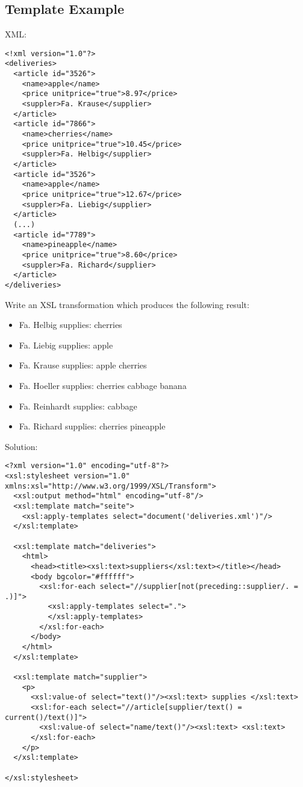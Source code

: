 \documentclass[11pt]{article}
\begin{document}
\subsection{Template Example}
\label{sec:orge6c1ba5}
XML:
\lstset{breaklines=true,language=XML,label= ,caption= ,captionpos=b,numbers=none}
\begin{lstlisting}
<!xml version="1.0"?>
<deliveries>
  <article id="3526">
    <name>apple</name>
    <price unitprice="true">8.97</price>
    <suppler>Fa. Krause</supplier>
  </article>
  <article id="7866">
    <name>cherries</name>
    <price unitprice="true">10.45</price>
    <suppler>Fa. Helbig</supplier>
  </article>
  <article id="3526">
    <name>apple</name>
    <price unitprice="true">12.67</price>
    <suppler>Fa. Liebig</supplier>
  </article>
  (...)
  <article id="7789">
    <name>pineapple</name>
    <price unitprice="true">8.60</price>
    <suppler>Fa. Richard</supplier>
  </article>
</deliveries>
\end{lstlisting}
Write an XSL transformation which produces the following result:
\begin{itemize}
\item Fa. Helbig supplies: cherries
\item Fa. Liebig supplies: apple
\item Fa. Krause supplies: apple cherries
\item Fa. Hoeller supplies: cherries cabbage banana
\item Fa. Reinhardt supplies: cabbage
\item Fa. Richard supplies: cherries pineapple
\end{itemize}

Solution:
\lstset{breaklines=true,language=XML,label= ,caption= ,captionpos=b,numbers=none}
\begin{lstlisting}
<?xml version="1.0" encoding="utf-8"?>
<xsl:stylesheet version="1.0" xmlns:xsl="http://www.w3.org/1999/XSL/Transform">
  <xsl:output method="html" encoding="utf-8"/>
  <xsl:template match="seite">
    <xsl:apply-templates select="document('deliveries.xml')"/>
  </xsl:template>

  <xsl:template match="deliveries">
    <html>
      <head><title><xsl:text>suppliers</xsl:text></title></head>
      <body bgcolor="#ffffff">
        <xsl:for-each select="//supplier[not(preceding::supplier/. = .)]">
          <xsl:apply-templates select=".">
          </xsl:apply-templates>
        </xsl:for-each>
      </body>
    </html>
  </xsl:template>

  <xsl:template match="supplier">
    <p>
      <xsl:value-of select="text()"/><xsl:text> supplies </xsl:text>
      <xsl:for-each select="//article[supplier/text() = current()/text()]">
        <xsl:value-of select="name/text()"/><xsl:text> <xsl:text>
      </xsl:for-each>
    </p>
  </xsl:template>

</xsl:stylesheet>
\end{lstlisting}
\end{document}
